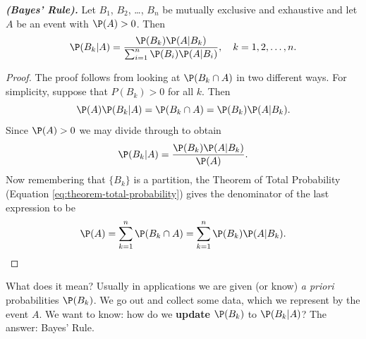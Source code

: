 \documentclass[captions=tableheading]{scrbook}
\begin{document}
\begin{thm}
\textbf{\emph{(Bayes' Rule).}} Let \(B_{1}\), \(B_{2}\), \ldots{}, \(B_{n}\) be mutually exclusive and exhaustive and let \(A\) be an event with \(\P(A)>0\). Then 
\begin{equation}
\P(B_{k}|A)=\frac{\P(B_{k})\P(A|B_{k})}{\sum_{i=1}^{n}\P(B_{i})\P(A|B_{i})},\quad k=1,2,\ldots,n.\label{eq:bayes-rule}
\end{equation}
\end{thm}

\begin{proof}
The proof follows from looking at \(\P(B_{k}\cap A)\) in two different ways. For simplicity, suppose that \(P(B_{k})>0\) for all \(k\). Then
\[
\P(A)\P(B_{k}|A)=\P(B_{k}\cap A)=\P(B_{k})\P(A|B_{k}).
\]
Since \(\P(A)>0\) we may divide through to obtain 
\[
\P(B_{k}|A)=\frac{\P(B_{k})\P(A|B_{k})}{\P(A)}.
\]
Now remembering that \(\{ B_{k} \}\) is a partition, the Theorem of Total Probability (Equation \ref{eq:theorem-total-probability}) gives the denominator of the last expression to be
\[
\P(A)=\sum_{k=1}^{n}\P(B_{k}\cap A)=\sum_{k=1}^{n}\P(B_{k})\P(A|B_{k}).
\]
\end{proof}

What does it mean? Usually in applications we are given (or know) \emph{a priori} probabilities \(\P(B_{k})\). We go out and collect some data, which we represent by the event \(A\). We want to know: how do we \textbf{update} \(\P(B_{k})\) to \(\P(B_{k}|A)\)? The answer: Bayes' Rule.
\end{document}
